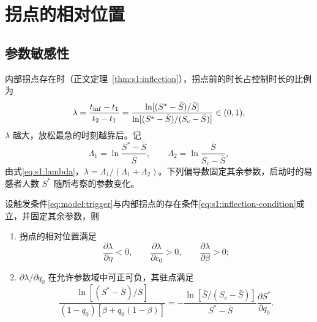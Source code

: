 \section{拐点的相对位置}
\label{sec:sup:inflection}

\subsection{参数敏感性}
\label{sec:s1:inflection-position}
内部拐点存在时（正文定理~\ref{thm:s1:inflection}），拐点前的时长占控制时长的比例为
\begin{equation}
\lambda=\frac{t_{\rm inf}-t_1}{t_2-t_1}
=\frac{\ln[(S^*-\bar S)/\bar S]}
{\ln[(S^*-\bar S)/(S_c-\bar S)]}\in(0,1),
\label{eq:s1:lambda}
\end{equation}
$\lambda$ 越大，放松最急的时刻越靠后。记
\[
\Lambda_1=\ln\frac{S^*-\bar S}{\bar S},\qquad
\Lambda_2=\ln\frac{\bar S}{S_c-\bar S},
\]
由式\eqref{eq:s1:lambda}，$\lambda=\Lambda_1/(\Lambda_1+\Lambda_2)$。下列偏导数固定其余参数，启动时的易感者人数 $S^*$ 随所考察的参数变化。
\begin{proposition}
\label{prop:s1:lambda-sensitivity}
设触发条件\eqref{eq:model:trigger}与内部拐点的存在条件\eqref{eq:s1:inflection-condition}成立，并固定其余参数，则
\begin{enumerate}
\renewcommand{\labelenumi}{(\roman{enumi})}
\item 拐点的相对位置满足
\[
\frac{\partial\lambda}{\partial\eta}<0,\qquad
\frac{\partial\lambda}{\partial c_0}>0,\qquad
\frac{\partial\lambda}{\partial\beta}>0;
\]
\item $\partial\lambda/\partial q_0$ 在允许参数域中可正可负，其驻点满足
\begin{equation}
\frac{\ln[(S^*-\bar S)/\bar S]}{(1-q_0)[\beta+q_0(1-\beta)]}
=-\frac{\ln[\bar S/(S_c-\bar S)]}{S^*-\bar S}
\frac{\partial S^*}{\partial q_0}.
\label{eq:s1:lambda-q0-stationary}
\end{equation}
\end{enumerate}
\end{proposition}
